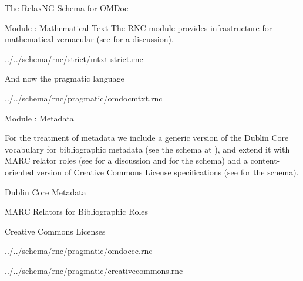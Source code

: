 \begin{omgroup}[id=rnc]{The RelaxNG Schema for OMDoc}
\begin{omgroup}[id=rnc.mtxt]{Module {}: Mathematical Text}
  The RNC module {} provides infrastructure for mathematical vernacular
  (see {} for a discussion).
  
  {../../schema/rnc/strict/mtxt-strict.rnc}

  And now the pragmatic language
  
                          {../../schema/rnc/pragmatic/omdocmtxt.rnc}
\end{omgroup}

\begin{omgroup}[id=rnc.meta]{Module {}: Metadata}

  For the treatment of metadata we include a generic version of the Dublin Core vocabulary
  for bibliographic metadata (see the schema at {}), and extend it with MARC
  relator roles (see {} for a discussion and
  {} for the schema) and a content-oriented version of Creative Commons
  License specifications (see {} for the schema).


\end{omgroup}

\begin{omgroup}[id=rnc.dc]{Dublin Core Metadata}


\end{omgroup}

\begin{omgroup}[id=rnc.marc]{MARC Relators for Bibliographic Roles}

\end{omgroup}

\begin{omgroup}[id=rnc.cc]{Creative Commons Licenses}

  {../../schema/rnc/pragmatic/omdoccc.rnc}

  {../../schema/rnc/pragmatic/creativecommons.rnc}
\end{omgroup}


\end{omgroup}
